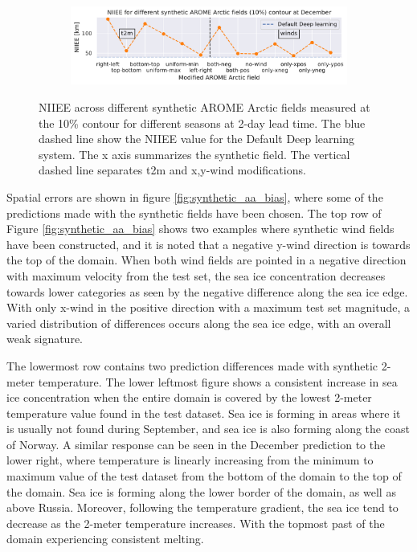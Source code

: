 \documentclass[../main/thesis.tex]{subfiles}
\begin{document}
\begin{figure}
\begin{subfigure}[t]{0.975\textwidth}
        \includegraphics[width=\textwidth, valign = t]{NIIEE_12.pdf}
    \end{subfigure}
    \caption{\label{fig:synthetic_aa_niiee}NIIEE across different synthetic AROME Arctic fields measured at the 10\% contour for different seasons at 2-day lead time. The blue dashed line show the NIIEE value for the Default Deep learning system. The x axis summarizes the synthetic field. The vertical dashed line separates t2m and x,y-wind modifications.}
\end{figure}

Spatial errors are shown in figure \ref{fig:synthetic_aa_bias}, where some of the predictions made with the synthetic fields have been chosen. The top row of Figure \ref{fig:synthetic_aa_bias} shows two examples where synthetic wind fields have been constructed, and it is noted that a negative y-wind direction is towards the top of the domain. When both wind fields are pointed in a negative direction with maximum velocity from the test set, the sea ice concentration decreases towards lower categories as seen by the negative difference along the sea ice edge. With only x-wind in the positive direction with a maximum test set magnitude, a varied distribution of differences occurs along the sea ice edge, with an overall weak signature.

The lowermost row contains two prediction differences made with synthetic 2-meter temperature. The lower leftmost figure shows a consistent increase in sea ice concentration when the entire domain is covered by the lowest 2-meter temperature value found in the test dataset. Sea ice is forming in areas where it is usually not found during September, and sea ice is also forming along the coast of Norway. A similar response can be seen in the December prediction to the lower right, where temperature is linearly increasing from the minimum to maximum value of the test dataset from the bottom of the domain to the top of the domain. Sea ice is forming along the lower border of the domain, as well as above Russia. Moreover, following the temperature gradient, the sea ice tend to decrease as the 2-meter temperature increases. With the topmost past of the domain experiencing consistent melting.
\end{document}

